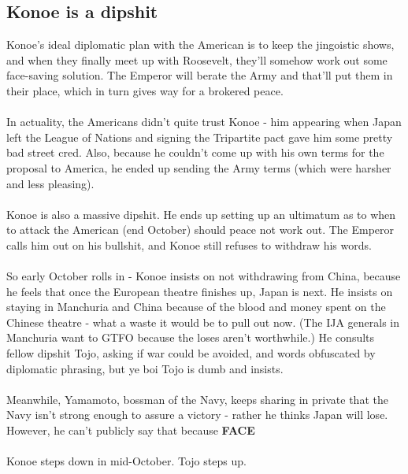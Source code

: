 \documentclass[a4paper]{article}
\begin{document}
\subsection{Konoe is a dipshit}
Konoe's ideal diplomatic plan with the American is to keep the jingoistic shows, and when they finally meet up with Roosevelt, they'll somehow work out some face-saving solution. The Emperor will berate the Army and that'll put them in their place, which in turn gives way for a brokered peace.\\
\\
In actuality, the Americans didn't quite trust Konoe - him appearing when Japan left the League of Nations and signing the Tripartite pact gave him some pretty bad street cred. Also, because he couldn't come up with his own terms for the proposal to America, he ended up sending the Army terms (which were harsher and less pleasing).\\
\\
Konoe is also a massive dipshit. He ends up setting up an ultimatum as to when to attack the American (end October) should peace not work out. The Emperor calls him out on his bullshit, and Konoe still refuses to withdraw his words.\\
\\
So early October rolls in - Konoe insists on not withdrawing from China, because he feels that once the European theatre finishes up, Japan is next. He insists on staying in Manchuria and China because of the blood and money spent on the Chinese theatre - what a waste it would be to pull out now. (The IJA generals in Manchuria want to GTFO because the loses aren't worthwhile.) He consults fellow dipshit Tojo, asking if war could be avoided, and words obfuscated by diplomatic phrasing, but ye boi Tojo is dumb and insists.\\
\\
Meanwhile, Yamamoto, bossman of the Navy, keeps sharing in private that the Navy isn't strong enough to assure a victory - rather he thinks Japan will lose. However, he can't publicly say that because \textbf{FACE}\\
\\
Konoe steps down in mid-October. Tojo steps up.
\end{document}
